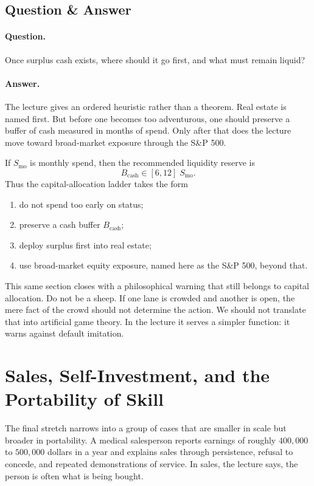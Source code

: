 \subsection{Question \& Answer}

\paragraph{Question.} Once surplus cash exists, where should it go first, and what must remain liquid?

\paragraph{Answer.} The lecture gives an ordered heuristic rather than a theorem. Real estate is named first. But before one becomes too adventurous, one should preserve a buffer of cash measured in months of spend. Only after that does the lecture move toward broad-market exposure through the S\&P 500.

If \(S_{\mathrm{mo}}\) is monthly spend, then the recommended liquidity reserve is
\begin{equation}
B_{\mathrm{cash}} \in [6,12]\;S_{\mathrm{mo}}.
\end{equation}
Thus the capital-allocation ladder takes the form
\begin{enumerate}
\item do not spend too early on status;
\item preserve a cash buffer \(B_{\mathrm{cash}}\);
\item deploy surplus first into real estate;
\item use broad-market equity exposure, named here as the S\&P 500, beyond that.
\end{enumerate}

This same section closes with a philosophical warning that still belongs to capital allocation. Do not be a sheep. If one lane is crowded and another is open, the mere fact of the crowd should not determine the action. We should not translate that into artificial game theory. In the lecture it serves a simpler function: it warns against default imitation.

\section{Sales, Self-Investment, and the Portability of Skill}

The final stretch narrows into a group of cases that are smaller in scale but broader in portability. A medical salesperson reports earnings of roughly \(400{,}000\) to \(500{,}000\) dollars in a year and explains sales through persistence, refusal to concede, and repeated demonstrations of service. In sales, the lecture says, the person is often what is being bought.

